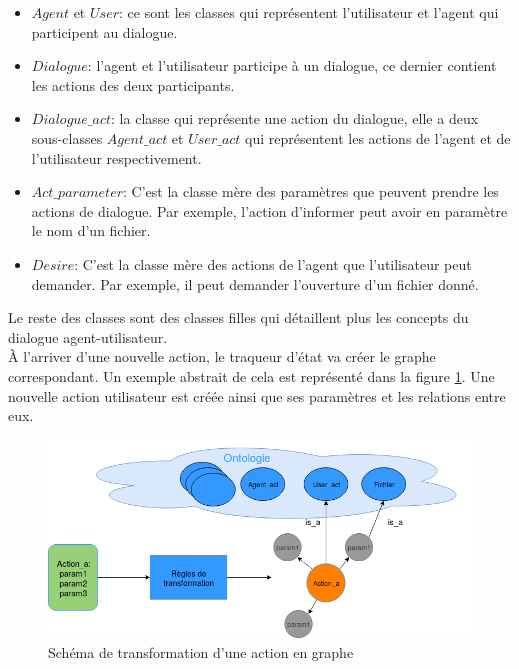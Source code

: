 \begin{itemize}
	\item $Agent$ et $User$: ce sont les classes qui représentent l'utilisateur et l'agent qui participent au dialogue.
	\item $Dialogue$: l'agent et l'utilisateur participe à un dialogue, ce dernier contient les actions des deux participants.
	\item $Dialogue\_act$: la classe qui représente une action du dialogue, elle a deux sous-classes $Agent\_act$ et $User\_act$ qui représentent les actions de l'agent et de l'utilisateur respectivement.
	\item $Act\_parameter$: C'est la classe mère des paramètres que peuvent prendre les actions de dialogue. Par exemple, l'action d'informer peut avoir en paramètre le nom d'un fichier.
	\item $Desire$: C'est la classe mère des actions de l'agent que l'utilisateur peut demander. Par exemple, il peut demander l'ouverture d'un fichier donné.
\end{itemize}
Le reste des classes sont des classes filles qui détaillent plus les concepts du dialogue agent-utilisateur.\\
À l'arriver d'une nouvelle action, le traqueur d'état va créer le graphe correspondant. Un exemple abstrait de cela est représenté dans la figure \ref{abstract_onto}. Une nouvelle action utilisateur est créée ainsi que ses paramètres et les relations entre eux.
\begin{figure}[H] 
	\centering
	\includegraphics[width=0.88\linewidth]{images/Conception/DM/abstract_onto.png}
	\caption{Schéma de transformation d'une action en graphe}\label{abstract_onto}
	
\end{figure}

